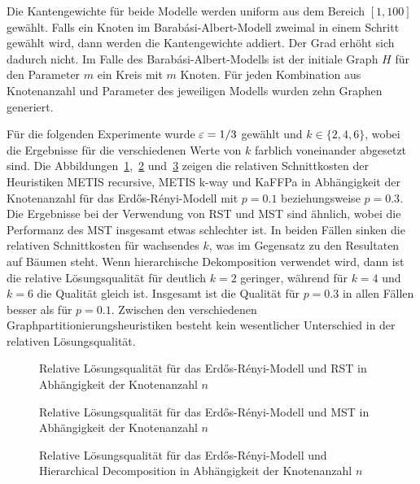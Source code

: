 Die Kantengewichte für beide Modelle werden uniform aus dem Bereich $[1, 100]$ gewählt.
Falls ein Knoten im Barabási-Albert-Modell zweimal in einem Schritt gewählt wird, dann werden die Kantengewichte addiert.
Der Grad erhöht sich dadurch nicht.
Im Falle des Barabási-Albert-Modells ist der initiale Graph $H$ für den Parameter $m$ ein Kreis mit $m$ Knoten.
Für jeden Kombination aus Knotenanzahl und Parameter des jeweiligen Modells wurden zehn Graphen generiert.

Für die folgenden Experimente wurde $\varepsilon=1/3$ gewählt und $k \in \{2, 4, 6\}$, wobei die Ergebnisse für die verschiedenen Werte von $k$ farblich voneinander abgesetzt sind.
Die Abbildungen~\ref{fig:edgeprobrstnode},~\ref{fig:edgeprobmstnode} und~\ref{fig:edgeprobhdecompnode} zeigen die relativen Schnittkosten der Heuristiken METIS recursive, METIS k-way und KaFFPa in Abhängigkeit der Knotenanzahl für das Erdős-Rényi-Modell mit $p=0.1$ beziehungsweise $p=0.3$.
Die Ergebnisse bei der Verwendung von RST und MST sind ähnlich, wobei die Performanz des MST insgesamt etwas schlechter ist.
In beiden Fällen sinken die relativen Schnittkosten für wachsendes $k$, was im Gegensatz zu den Resultaten auf Bäumen steht.
Wenn hierarchische Dekomposition verwendet wird, dann ist die relative Lösungsqualität für deutlich $k=2$ geringer, während für $k=4$ und $k=6$ die Qualität gleich ist.
Insgesamt ist die Qualität für $p=0.3$ in allen Fällen besser als für $p=0.1$.
Zwischen den verschiedenen Graphpartitionierungsheuristiken besteht kein wesentlicher Unterschied in der relativen Lösungsqualität.

\vfill\clearpage

\begin{figure}[H]
    \centering
    
    \caption{Relative Lösungsqualität für das Erdős-Rényi-Modell und RST in Abhängigkeit der Knotenanzahl $n$\label{fig:edgeprobrstnode}}
\end{figure}

\begin{figure}[H]
    \centering
    
    \caption{Relative Lösungsqualität für das Erdős-Rényi-Modell und MST in Abhängigkeit der Knotenanzahl $n$\label{fig:edgeprobmstnode}}
\end{figure}

\begin{figure}[H]
    \centering
    
    \caption{Relative Lösungsqualität für das Erdős-Rényi-Modell und Hierarchical Decomposition in Abhängigkeit der Knotenanzahl $n$\label{fig:edgeprobhdecompnode}}
\end{figure}

